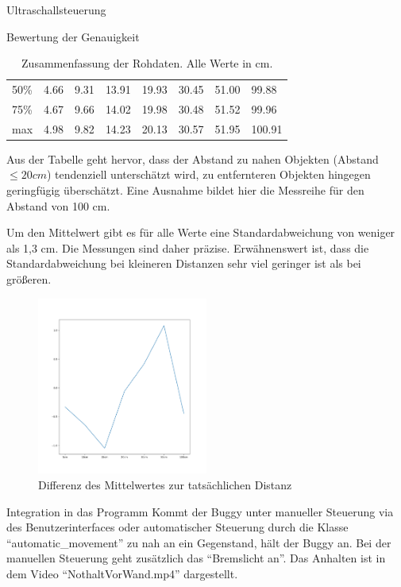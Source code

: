 \documentclass[12pt]{report}
\begin{document}
\begin{section}{Ultraschallsteuerung}
\begin{subsection}{Bewertung der Genauigkeit}
\begin{table}[h!]
\begin{tabularx}{\textwidth}{XXXXXXXX}
            50\%   &    4.66 &    9.31 &   13.91 &   19.93 &   30.45 &   51.00 &   99.88 \\
            75\%   &    4.67 &    9.66 &   14.02 &   19.98 &   30.48 &   51.52 &   99.96 \\
            max   &    4.98 &    9.82 &   14.23 &   20.13 &   30.57 &   51.95 &  100.91 \\
          \end{tabularx}
        \caption{Zusammenfassung der Rohdaten. Alle Werte in cm.}
    \end{table}
    Aus der Tabelle geht hervor, dass der Abstand zu nahen
    Objekten (Abstand $\leq{} 20 cm$) tendenziell unterschätzt wird, zu entfernteren
    Objekten hingegen geringfügig überschätzt. Eine Ausnahme bildet hier die
    Messreihe für den Abstand von 100 cm.
    
    Um den Mittelwert gibt es für alle Werte eine Standardabweichung von weniger
    als 1,3 cm. Die Messungen sind daher präzise. Erwähnenswert ist, dass die
    Standardabweichung bei kleineren Distanzen sehr viel geringer ist als bei größeren.

    \begin{figure}[H]
      \centering
      \includegraphics[width=0.5\textwidth]{test_data_ultrasonic/meanDiff.png}
      \caption{Differenz des Mittelwertes zur tatsächlichen Distanz}
    \end{figure}

  \end{subsection}
  \begin{subsection}{Integration in das Programm}
    Kommt der Buggy unter manueller Steuerung via des Benutzerinterfaces oder
    automatischer Steuerung durch die Klasse "`automatic\_movement"' zu nah
    an ein Gegenstand, hält der Buggy an. Bei der manuellen Steuerung geht zusätzlich
    das "`Bremslicht an"'.
    Das Anhalten ist in dem Video "`NothaltVorWand.mp4"' dargestellt.
  \end{subsection}

\end{section}
\end{document}
